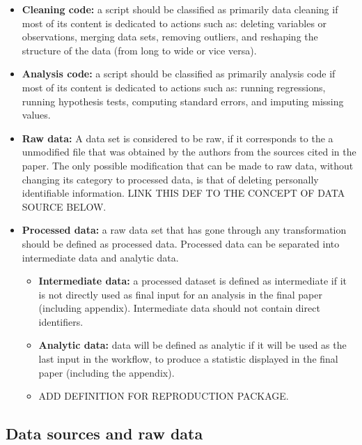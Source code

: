 \documentclass[]{book}
\providecommand{\tightlist}{%
  \setlength{\itemsep}{0pt}\setlength{\parskip}{0pt}}
\begin{document}
\begin{itemize}
\tightlist
\item
  \textbf{Cleaning code:} a script should be classified as primarily data cleaning if most of its content is dedicated to actions such as: deleting variables or observations, merging data sets, removing outliers, and reshaping the structure of the data (from long to wide or vice versa).\\
\item
  \textbf{Analysis code:} a script should be classified as primarily analysis code if most of its content is dedicated to actions such as: running regressions, running hypothesis tests, computing standard errors, and imputing missing values.\\
\item
  \textbf{Raw data:} A data set is considered to be raw, if it corresponds to the a unmodified file that was obtained by the authors from the sources cited in the paper. The only possible modification that can be made to raw data, without changing its category to processed data, is that of deleting personally identifiable information. LINK THIS DEF TO THE CONCEPT OF DATA SOURCE BELOW.
\item
  \textbf{Processed data:} a raw data set that has gone through any transformation should be defined as processed data. Processed data can be separated into intermediate data and analytic data.

  \begin{itemize}
  \tightlist
  \item
    \textbf{Intermediate data:} a processed dataset is defined as intermediate if it is not directly used as final input for an analysis in the final paper (including appendix). Intermediate data should not contain direct identifiers.
  \item
    \textbf{Analytic data:} data will be defined as analytic if it will be used as the last input in the workflow, to produce a statistic displayed in the final paper (including the appendix).
  \item
    ADD DEFINITION FOR REPRODUCTION PACKAGE.
  \end{itemize}
\end{itemize}

\hypertarget{data-sources-and-raw-data}{%
\subsection{Data sources and raw data}\label{data-sources-and-raw-data}}
\end{document}
